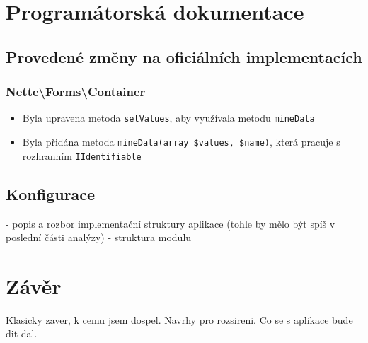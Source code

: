 \documentclass[11pt,oneside]{fithesis}
\begin{document}
\chapter{Programátorská dokumentace}

\section{Provedené změny na oficiálních implementacích}

\subsection{Nette\textbackslash Forms\textbackslash Container}
    \begin{itemize}
    \item Byla upravena metoda \verb|setValues|, aby využívala metodu \verb|mineData|
    \item Byla přidána metoda \verb|mineData(array $values, $name)|, která pracuje s rozhranním \verb|IIdentifiable|
    \end{itemize}

\section{Konfigurace}
- popis a rozbor implementační struktury aplikace (tohle by mělo být spíš v poslední části analýzy)
- struktura modulu






























\chapter{Závěr}
Klasicky zaver, k cemu jsem dospel. Navrhy pro rozsireni.
Co se s aplikace bude dit dal.
\end{document}
